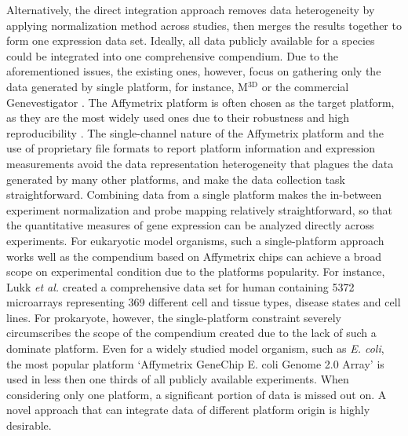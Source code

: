 Alternatively, the direct integration approach removes data heterogeneity by applying normalization method across studies, then merges the results together to form one expression data set. Ideally, all data publicly available for a species could be integrated into one comprehensive compendium. Due to the aforementioned issues, the existing ones, however, focus on gathering only the data generated by single platform, for instance, M$^{\textrm{3D}}$ \cite{Faith2008} or the commercial Genevestigator \cite{Hruz2008}. The Affymetrix platform is often chosen as the target platform, as they are the most widely used ones due to their robustness and high reproducibility \cite{Bammler2005, Irizarry2005}. The single-channel nature of the Affymetrix platform and the use of proprietary file formats to report platform information and expression measurements avoid the data representation heterogeneity that plagues the data generated by many other platforms, and make the data collection task straightforward. Combining data from a single platform makes the in-between experiment normalization and probe mapping relatively straightforward, so that the quantitative measures of gene expression can be analyzed directly across experiments. For eukaryotic model organisms, such a single-platform approach works well as the compendium based on Affymetrix chips can achieve a broad scope on experimental condition due to the platforms popularity. For instance, Lukk \textit{et al.} \cite{Lukk2010} created a comprehensive data set for human containing 5372 microarrays representing 369 different cell and tissue types, disease states and cell lines. For prokaryote, however, the single-platform constraint severely circumscribes the scope of the compendium created due to the lack of such a dominate platform. Even for a widely studied model organism, such as {\it E. coli}, the most  popular platform `Affymetrix GeneChip E. coli Genome 2.0 Array' is used in less  then one thirds of all publicly available experiments. When considering only one platform, a significant portion of data is missed out  on.  A novel approach that can integrate data of different platform origin is highly desirable.



